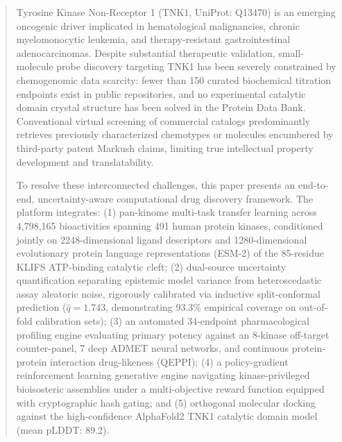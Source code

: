 \documentclass[journal]{IEEEtran}
\begin{document}
\begin{abstract}
Tyrosine Kinase Non-Receptor 1 (TNK1, UniProt: Q13470) is an emerging oncogenic driver implicated in hematological malignancies, chronic myelomonocytic leukemia, and therapy-resistant gastrointestinal adenocarcinomas. Despite substantial therapeutic validation, small-molecule probe discovery targeting TNK1 has been severely constrained by chemogenomic data scarcity: fewer than 150 curated biochemical titration endpoints exist in public repositories, and no experimental catalytic domain crystal structure has been solved in the Protein Data Bank. Conventional virtual screening of commercial catalogs predominantly retrieves previously characterized chemotypes or molecules encumbered by third-party patent Markush claims, limiting true intellectual property development and translatability.

To resolve these interconnected challenges, this paper presents an end-to-end, uncertainty-aware computational drug discovery framework. The platform integrates: (1) pan-kinome multi-task transfer learning across 4,798,165 bioactivities spanning 491 human protein kinases, conditioned jointly on 2248-dimensional ligand descriptors and 1280-dimensional evolutionary protein language representations (ESM-2) of the 85-residue KLIFS ATP-binding catalytic cleft; (2) dual-source uncertainty quantification separating epistemic model variance from heteroscedastic assay aleatoric noise, rigorously calibrated via inductive split-conformal prediction ($\hat{q} = 1.743$, demonstrating 93.3\% empirical coverage on out-of-fold calibration sets); (3) an automated 34-endpoint pharmacological profiling engine evaluating primary potency against an 8-kinase off-target counter-panel, 7 deep ADMET neural networks, and continuous protein-protein interaction drug-likeness (QEPPI); (4) a policy-gradient reinforcement learning generative engine navigating kinase-privileged bioisosteric assemblies under a multi-objective reward function equipped with cryptographic hash gating; and (5) orthogonal molecular docking against the high-confidence AlphaFold2 TNK1 catalytic domain model (mean pLDDT: 89.2).


\end{abstract}
\end{document}
